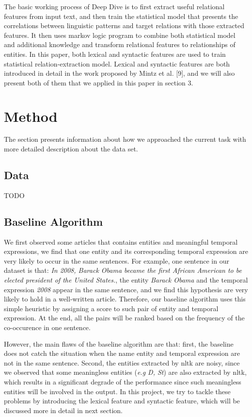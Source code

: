 \documentclass[12pt,a4paper]{article}
\begin{document}
The basic working process of Deep Dive is to first extract useful relational features from input text, and then train the statistical model that presents the correlations between linguistic patterns and target relations with those extracted features. It then uses markov logic program to combine both statistical model and additional knowledge and transform relational features to relationships of entities. In this paper, both lexical and syntactic features are used to train statistical relation-extraction model. Lexical and syntactic features are both introduced in detail in the work proposed by Mintz et al. [9], and we will also present both of them that we applied in this paper in section 3.
\section{Method}
The section presents information about how we approached the current task with more detailed description about the data set. 

\subsection{Data}
TODO

\subsection{Baseline Algorithm}
We first observed some articles that contains entities and meaningful temporal expressions, we find that one entity and its corresponding temporal expression are very likely to occur in the same sentences. For example, one sentence in our dataset is that: \textit{In 2008, Barack Obama became the first African American to be elected president of the United States.}, the entity \textit{Barack Obama} and the temporal expression \textit{2008} appear in the same sentence, and we find this hypothesis are very likely to hold in a well-written article. Therefore, our baseline algorithm uses this simple heuristic by assigning a score to such pair of entity and temporal expression. At the end, all the pairs will be ranked based on the frequency of the co-occurence in one sentence. 

However, the main flaws of the baseline algorithm are that: first, the baseline does not catch the situation when the name entity and temporal expression are not in the same sentence. Second, the entities extracted by nltk are noisy, since we observed that some meaningless entities (\textit{e.g D, St}) are also extracted by nltk, which results in a significant degrade of the performance since such meaningless entities will be involved in the output. In this project, we try to tackle these problems by introducing the lexical feature and syntactic feature, which will be discussed more in detail in next section. 
\end{document}
